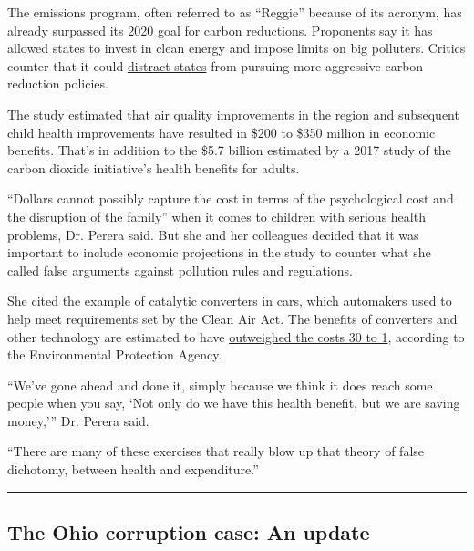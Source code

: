 The emissions program, often referred to as ``Reggie'' because of its
acronym, has already surpassed its 2020 goal for carbon reductions.
Proponents say it has allowed states to invest in clean energy and
impose limits on big polluters. Critics counter that it could
\href{https://energynews.us/2019/10/25/northeast/how-much-credit-does-rggi-deserve-for-the-northeasts-progress-on-emissions/}{distract
states} from pursuing more aggressive carbon reduction policies.

The study estimated that air quality improvements in the region and
subsequent child health improvements have resulted in \$200 to \$350
million in economic benefits. That's in addition to the \$5.7 billion
estimated by a 2017 study of the carbon dioxide initiative's health
benefits for adults.

``Dollars cannot possibly capture the cost in terms of the psychological
cost and the disruption of the family'' when it comes to children with
serious health problems, Dr. Perera said. But she and her colleagues
decided that it was important to include economic projections in the
study to counter what she called false arguments against pollution rules
and regulations.

She cited the example of catalytic converters in cars, which automakers
used to help meet requirements set by the Clean Air Act. The benefits of
converters and other technology are estimated to have
\href{https://www.epa.gov/clean-air-act-overview/benefits-and-costs-clean-air-act-1990-2020-second-prospective-study}{outweighed
the costs 30 to 1}, according to the Environmental Protection Agency.

``We've gone ahead and done it, simply because we think it does reach
some people when you say, `Not only do we have this health benefit, but
we are saving money,''' Dr. Perera said.

``There are many of these exercises that really blow up that theory of
false dichotomy, between health and expenditure.''

\begin{center}\rule{0.5\linewidth}{\linethickness}\end{center}

\hypertarget{the-ohio-corruption-case-an-update}{%
\subsection{The Ohio corruption case: An
update}\label{the-ohio-corruption-case-an-update}}

